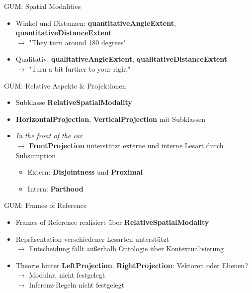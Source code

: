 \documentclass[12pt,a4paper]{beamer}
\begin{document}
\begin{frame}{GUM: Spatial Modalities}
\begin{itemize}
\item Winkel und Distanzen: \textbf{quantitativeAngleExtent}, \textbf{quantitativeDistanceExtent} \\
$\to$ "They turn around 180 degrees"
\item Qualitativ: \textbf{qualitativeAngleExtent}, \textbf{qualitativeDistanceExtent} \\
$\to$ "Turn a bit further to your right"
\end{itemize}
\end{frame}


\begin{frame}{GUM: Relative Aspekte \& Projektionen}
\begin{itemize}
\item Subklasse \textbf{RelativeSpatialModality}
\item \textbf{HorizontalProjection}, \textbf{VerticalProjection} mit Subklassen \\
\item \textit{In the front of the car} \\
$\to$ \textbf{FrontProjection} unterstützt externe und interne Lesart durch Subsumption
\begin{itemize}
    \item Extern: \textbf{Disjointness} und \textbf{Proximal}
    \item Intern: \textbf{Parthood}
\end{itemize}
\end{itemize}
\end{frame}



\begin{frame}{GUM: Frames of Reference}
\begin{itemize}
\item Frames of Reference realisiert über \textbf{RelativeSpatialModality}
\item Repräsentation verschiedener Lesarten unterstützt \\
$\to$ Entscheidung fällt außerhalb Ontologie über Kontextualisierung
\item Theorie hinter \textbf{LeftProjection}, \textbf{RightProjection}: Vektoren oder Ebenen? \\
$\to$ Modular, nicht festgelegt \\
$\to$ Inferenz-Regeln nicht festgelegt
\end{itemize}
\end{frame}
\end{document}
